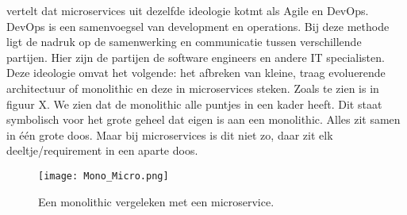 \textcite{Benetis2016a} vertelt dat microservices uit dezelfde ideologie kotmt als Agile en DevOps. DevOps is een samenvoegsel van development en operations. Bij deze methode ligt de nadruk op de samenwerking en communicatie tussen verschillende partijen. Hier zijn de partijen de software engineers en andere IT specialisten. Deze ideologie omvat het volgende: het afbreken van kleine, traag evoluerende architectuur of monolithic en deze in microservices steken. Zoals te zien is in figuur X. We zien dat de monolithic alle puntjes in een kader heeft. Dit staat symbolisch voor het grote geheel dat eigen is aan een monolithic. Alles zit samen in één grote doos. Maar bij microservices is dit niet zo, daar zit elk deeltje/requirement in een aparte doos. 
\begin{figure}[h]
	\texttt{[image: Mono\_Micro.png]}
	\centering
	\caption{Een monolithic vergeleken met een microservice. \textcite{Benetis2016a}}
\end{figure}


